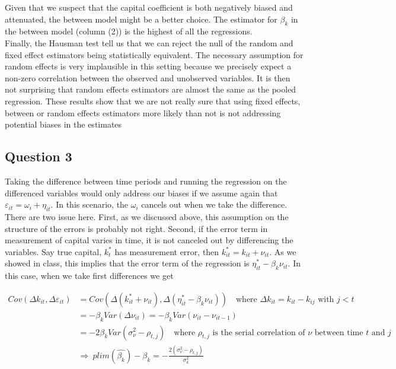 \documentclass[11pt]{article}
\begin{document}
Given that we suspect that the capital coefficient is both negatively biased and attenuated, the between model might be a better choice. The estimator for $\beta_k$ in the between model (column (2)) is the highest of all the regressions. \\

Finally, the Hausman test tell us that we can reject the null of the random and fixed effect estimators being statistically equivalent. The necessary assumption for random effects is very implausible in this setting because we precisely expect a non-zero correlation between the observed and unobserved variables. It is then not surprising that random effects estimators are almost the same as the pooled regression.  These results show that we are not really sure that using fixed effects, between or random effects estimators more likely than not is not addressing potential biases in the estimates



\FloatBarrier

\subsection*{Question 3} \label{q3}



\FloatBarrier

Taking the difference between time periods and running the regression on the differenced variables would only address our biases if we assume again that $\varepsilon_{it}=\omega_i+\eta_{it}$. In this scenario, the $\omega_i$ cancels out when we take the difference. There are two issue here. First, as we discussed above, this assumption on the structure of the errors is probably not right. Second, if the error term in measurement of capital varies in time, it is not canceled out by differencing the variables. Say true capital, $k^*_t$ has measurement error, then $k^*_{it}=k_{it}+\nu_{it}$. As we showed in class, this implies that the error term of the regression is $\eta_{it}^*-\beta_k\nu_{it}$. In this case, when we take first differences we get


\begin{align}\label{eq:bias}
 Cov(\Delta k_{it},\Delta \varepsilon_{it})& =
Cov\left(\Delta (k_{it}^*+\nu_{it} ),\Delta (\eta_{it}^*-\beta_k\nu_{it})\right) \quad \text{where $\Delta k_{it}=k_{it}-k_{ij}$ with $j<t$}\\ \nonumber
&=-\beta_k Var(\Delta \nu_{it})=-\beta_k Var(\nu_{it}-\nu_{it-1})\\ \nonumber
 &=-2\beta_k Var(\sigma^2_{\nu}-\rho_{t,j}) \quad \text{where $\rho_{t,j}$ is the serial correlation of $\nu$ between time $t$ and $j$}\\ \nonumber
 & 	\Rightarrow \ 
 plim(\hat{\beta_k})-\beta_k= -\frac{2(\sigma^2_{\nu}-\rho_{t,j})}{\sigma_{k}^2 } \\ \nonumber
\end{align}
\end{document}
